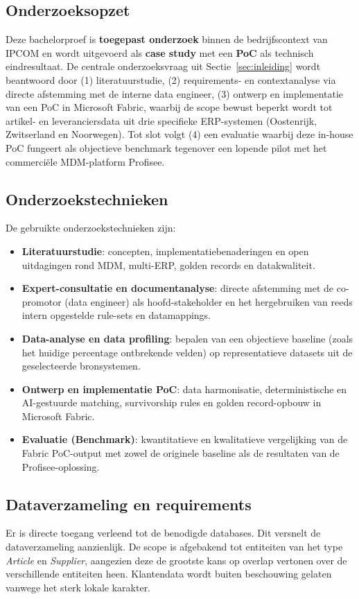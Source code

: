 \subsection{Onderzoeksopzet}
Deze bachelorproef is \textbf{toegepast onderzoek} binnen de bedrijfscontext van IPCOM en wordt uitgevoerd als \textbf{case study} met een \textbf{PoC} als technisch eindresultaat. De centrale onderzoeksvraag uit Sectie~\ref{sec:inleiding} wordt beantwoord door (1) literatuurstudie, (2) requirements- en contextanalyse via directe afstemming met de interne data engineer, (3) ontwerp en implementatie van een PoC in Microsoft Fabric, waarbij de scope bewust beperkt wordt tot artikel- en leveranciersdata uit drie specifieke ERP-systemen (Oostenrijk, Zwitserland en Noorwegen). Tot slot volgt (4) een evaluatie waarbij deze in-house PoC fungeert als objectieve benchmark tegenover een lopende pilot met het commerciële MDM-platform Profisee.

\subsection{Onderzoekstechnieken}
De gebruikte onderzoekstechnieken zijn:
\begin{itemize}
  \item \textbf{Literatuurstudie}: concepten, implementatiebenaderingen en open uitdagingen rond MDM, multi-ERP, golden records en datakwaliteit.
  \item \textbf{Expert-consultatie en documentanalyse}: directe afstemming met de co-promotor (data engineer) als hoofd-stakeholder en het hergebruiken van reeds intern opgestelde rule-sets en datamappings.
  \item \textbf{Data-analyse en data profiling}: bepalen van een objectieve baseline (zoals het huidige percentage ontbrekende velden) op representatieve datasets uit de geselecteerde bronsystemen.
  \item \textbf{Ontwerp en implementatie PoC}: data harmonisatie, deterministische en AI-gestuurde matching, survivorship rules en golden record-opbouw in Microsoft Fabric.
  \item \textbf{Evaluatie (Benchmark)}: kwantitatieve en kwalitatieve vergelijking van de Fabric PoC-output met zowel de originele baseline als de resultaten van de Profisee-oplossing.
\end{itemize}

\subsection{Dataverzameling en requirements}
 Er is directe toegang verleend tot de benodigde databases. Dit versnelt de dataverzameling aanzienlijk. De scope is afgebakend tot entiteiten van het type \emph{Article} en \emph{Supplier}, aangezien deze de grootste kans op overlap vertonen over de verschillende entiteiten heen. Klantendata wordt buiten beschouwing gelaten vanwege het sterk lokale karakter. 


